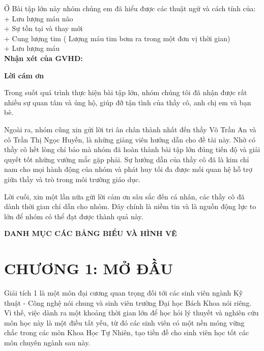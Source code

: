 \documentclass[12pt,a4paper]{article}
\begin{document}
Ở Bài tập lớn này nhóm chúng em đã hiểu được các thuật ngữ và cách tính của:\\
+ Lưu lượng máu não\\
+ Sự tồn tại và thay mới\\
+ Cung lượng tim ( Lượng máu tim bơm ra trong một đơn vị thời gian)\\
+ Lưu lượng máu \\


\textbf{Nhận xét của GVHD:}

\newpage
\begin{center}
	\large\textbf{Lời cám ơn}
\end{center}

Trong suốt quá trình thực hiện bài tập lớn, nhóm chúng tôi đã nhận 
được rất nhiều sự quan tâm và ủng hộ, giúp đỡ tận tình của thầy cô, 
anh chị em và bạn bè.

\vspace{1em}

Ngoài ra, nhóm cũng xin gửi lời tri ân chân thành nhất đến thầy 
Võ Trần An và cô Trần Thị Ngọc Huyền, là những giảng viên hướng dẫn cho đề tài 
này. Nhờ có thầy cô hết lòng chỉ bảo mà nhóm đã hoàn thành bài tập lớn đúng 
tiến độ và giải quyết tốt những vướng mắc gặp phải. Sự hướng dẫn của thầy cô đã 
là kim chỉ nam cho mọi hành động của nhóm và phát huy tối đa được mối quan hệ 
hỗ trợ giữa thầy và trò trong môi trường giáo dục.

\vspace{1em}

Lời cuối, xin một lần nữa gửi lời cảm ơn sâu sắc đến cá nhân, 
các thầy cô đã dành thời gian chỉ dẫn cho nhóm. Đây chính là niềm tin 
và là nguồn động lực to lớn để nhóm có thể đạt được thành quả này.

\newpage
\begin{center}
	\tableofcontents
\end{center}

\newpage
\begin{center}
	\Large\textbf{DANH MỤC CÁC BẢNG BIỂU VÀ HÌNH VẼ}
\end{center}
\listoftables{}
\listoffigures{}

\newpage
{}
\section*{CHƯƠNG 1: MỞ ĐẦU}
Giải tích 1 là một môn đại cương quan trọng đối tới các sinh viên ngành Kỹ thuật - Công nghệ nói chung và sinh viên 
trường Đại học Bách Khoa nói riêng. Vì thế, việc dành ra một khoảng thời gian lớn để học hỏi lý thuyết và nghiên cứu 
môn học này là một điều tất yếu, từ đó các sinh viên có một nền móng vững chắc trong các môn Khoa Học Tự Nhiên, tạo 
tiền đề cho sinh viên học tốt các môn chuyên ngành sau này.
\end{document}
